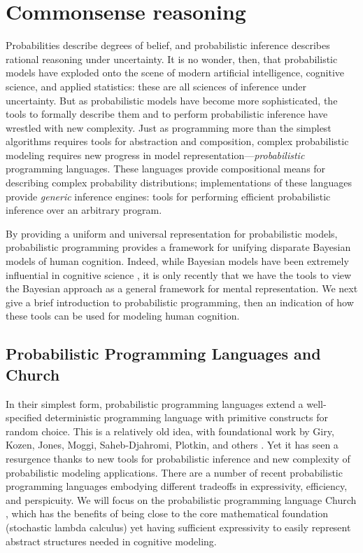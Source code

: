 \documentclass[12pt]{article}
\begin{document}
\section{Commonsense reasoning}
\label{background}

Probabilities describe degrees of belief, and probabilistic inference describes rational reasoning under uncertainty. It is no wonder, then, that probabilistic models have exploded onto the scene of modern artificial intelligence, cognitive science, and applied statistics: these are all sciences of inference under uncertainty. But as probabilistic models have become more sophisticated, the tools to formally describe them and to perform probabilistic inference have wrestled with new complexity. Just as programming more than the simplest algorithms requires tools for abstraction and composition, complex probabilistic modeling requires new progress in model representation---\emph{probabilistic} programming languages. These languages provide compositional means for describing complex probability distributions; implementations of these languages provide \emph{generic} inference engines: tools for performing efficient probabilistic inference over an arbitrary program. 

By providing a uniform and universal representation for probabilistic models, probabilistic programming provides a framework for unifying disparate Bayesian models of human cognition. Indeed, while Bayesian models have been extremely influential in cognitive science \cite[e.g.][]{tenenbaum2011}, 
%
%
it is only recently that we have the tools to view the Bayesian approach as a general framework for mental representation.
We next give a brief introduction to probabilistic programming, then an indication of how these tools can be used for modeling human cognition.

\subsection{Probabilistic Programming Languages and Church}

In their simplest form, probabilistic programming languages extend a well-specified deterministic programming language with primitive constructs for random choice. 
This is a relatively old idea, with foundational work by Giry, Kozen, Jones, Moggi, Saheb-Djahromi, Plotkin, and others \cite[see e.g.][]{JP89}. Yet it has seen a resurgence thanks to new tools for probabilistic inference and new complexity of probabilistic modeling applications. There are a number of recent probabilistic programming languages \cite[e.g.][]{sato97,Pfeffer01,milch05,richardson06,Poole:2008wk,kiselyovS09,Pfeffer:2009wo,mccallum2009factorie,Kimmig:2011tn}
embodying different tradeoffs in expressivity, efficiency, and perspicuity. 
We will focus on the probabilistic programming language Church  \cite{goodman2008}, which has the benefits of being close to the core mathematical foundation (stochastic lambda calculus) yet having sufficient expressivity to easily represent abstract structures needed in cognitive modeling.
\end{document}
